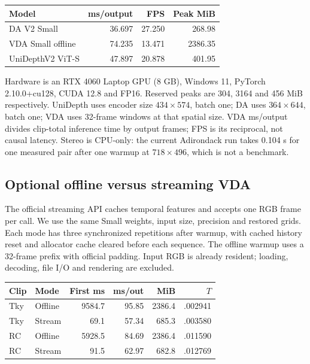 \documentclass[10pt,twocolumn,letterpaper]{article}
\begin{document}
\begin{center}\begin{minipage}{\linewidth}\centering
{}
\label{tab:resources}
\small
\begin{tabular}{lrrr}
\toprule
Model & ms/output & FPS & Peak MiB\\
\midrule
DA V2 Small &36.697&27.250&268.98\\
VDA Small offline &74.235&13.471&2386.35\\
UniDepthV2 ViT-S &47.897&20.878&401.95\\
\bottomrule
\end{tabular}
\end{minipage}\end{center}

Hardware is an RTX 4060 Laptop GPU (8 GB), Windows 11, PyTorch 2.10.0+cu128, CUDA 12.8 and FP16. Reserved peaks are 304, 3164 and 456 MiB respectively. UniDepth uses encoder size $434\times574$, batch one; DA uses $364\times644$, batch one; VDA uses 32-frame windows at that spatial size. VDA ms/output divides clip-total inference time by output frames; FPS is its reciprocal, not causal latency. Stereo is CPU-only: the current Adirondack run takes 0.104 s for one measured pair after one warmup at $718\times496$, which is not a benchmark.


\subsection{Optional offline versus streaming VDA}
The official streaming API caches temporal features and accepts one RGB frame per call. We use the same Small weights, input size, precision and restored grids. Each mode has three synchronized repetitions after warmup, with cached history reset and allocator cache cleared before each sequence. The offline warmup uses a 32-frame prefix with official padding. Input RGB is already resident; loading, decoding, file I/O and rendering are excluded.

\begin{center}\begin{minipage}{\linewidth}\centering
{}
\label{tab:streaming}
\scriptsize
\begin{tabular}{llrrrr}
\toprule
Clip&Mode&First ms&ms/out&MiB&$T$\\
\midrule
Tky&Offline&9584.7&95.85&2386.4&.002941\\
Tky&Stream&69.1&57.34&685.3&.003580\\
RC&Offline&5928.5&84.69&2386.4&.011590\\
RC&Stream&91.5&62.97&682.8&.012769\\
\bottomrule
\end{tabular}
\end{minipage}\end{center}
\end{document}
